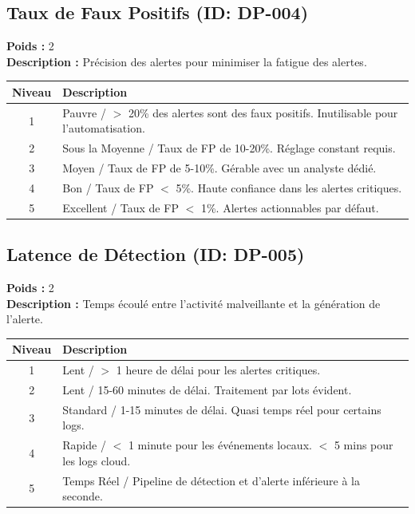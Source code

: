 \documentclass{article}
\begin{document}
\subsection{Taux de Faux Positifs (ID: DP-004)}
\textbf{Poids :} 2 \\
\textbf{Description :} Précision des alertes pour minimiser la fatigue des alertes.
\vspace{0.3cm}
\begin{longtable}{|c|p{12cm}|}
\hline
\rowcolor{lightgray} \textbf{Niveau} & \textbf{Description} \\ \hline
1 & Pauvre / $>$ 20\% des alertes sont des faux positifs. Inutilisable pour l'automatisation. \\ \hline
2 & Sous la Moyenne / Taux de FP de 10-20\%. Réglage constant requis. \\ \hline
3 & Moyen / Taux de FP de 5-10\%. Gérable avec un analyste dédié. \\ \hline
4 & Bon / Taux de FP $<$ 5\%. Haute confiance dans les alertes critiques. \\ \hline
5 & Excellent / Taux de FP $<$ 1\%. Alertes actionnables par défaut. \\ \hline
\end{longtable}
\vspace{0.5cm}
\subsection{Latence de Détection (ID: DP-005)}
\textbf{Poids :} 2 \\
\textbf{Description :} Temps écoulé entre l'activité malveillante et la génération de l'alerte.
\vspace{0.3cm}
\begin{longtable}{|c|p{12cm}|}
\hline
\rowcolor{lightgray} \textbf{Niveau} & \textbf{Description} \\ \hline
1 & Lent / $>$ 1 heure de délai pour les alertes critiques. \\ \hline
2 & Lent / 15-60 minutes de délai. Traitement par lots évident. \\ \hline
3 & Standard / 1-15 minutes de délai. Quasi temps réel pour certains logs. \\ \hline
4 & Rapide / $<$ 1 minute pour les événements locaux. $<$ 5 mins pour les logs cloud. \\ \hline
5 & Temps Réel / Pipeline de détection et d'alerte inférieure à la seconde. \\ \hline
\end{longtable}
\vspace{0.5cm}
\end{document}

